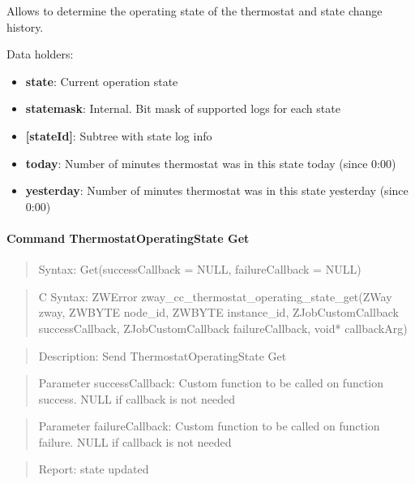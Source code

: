 Allows to determine the operating state of the thermostat and state change history.
\newline

\noindent
Data holders:

\begin{itemize}
\item \textbf{state}: Current operation state
\item \textbf{statemask}: Internal. Bit mask of supported logs for each state
\item \textbf{[stateId]}: Subtree with state log info
\item \qquad\textbf{today}: Number of minutes thermostat was in this state today (since 0:00)
\item \qquad\textbf{yesterday}: Number of minutes thermostat was in this state yesterday (since 0:00)
\end{itemize}

\paragraph{Command ThermostatOperatingState Get}
\begin{quote}Syntax: Get(successCallback = NULL, failureCallback = NULL)\end{quote}
\begin{quote}C Syntax: ZWError zway\_cc\_thermostat\_operating\_state\_get(ZWay zway, ZWBYTE node\_id, ZWBYTE instance\_id, ZJobCustomCallback successCallback, ZJobCustomCallback failureCallback, void* callbackArg)\end{quote}
\begin{quote}Description: Send ThermostatOperatingState Get\end{quote}
\begin{quote}Parameter successCallback: Custom function to be called on function success. NULL if callback is not needed\end{quote}
\begin{quote}Parameter failureCallback: Custom function to be called on function failure. NULL if callback is not needed\end{quote}
\begin{quote}Report: state updated\end{quote}

